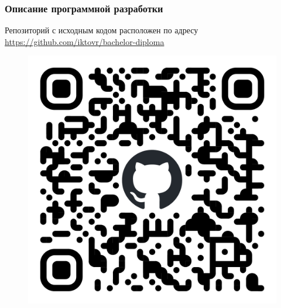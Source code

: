 \documentclass[pdf, hyperref={unicode}, aspectratio=169]{beamer}
\begin{document}
\begin{frame}
\frametitle{Описание программной разработки}

Репозиторий с исходным кодом расположен по адресу \url{https://github.com/iktovr/bachelor-diploma}

\begin{figure}
\includegraphics[height=0.7\textheight]{img/qr-code}
\end{figure}

\end{frame}
\end{document}
